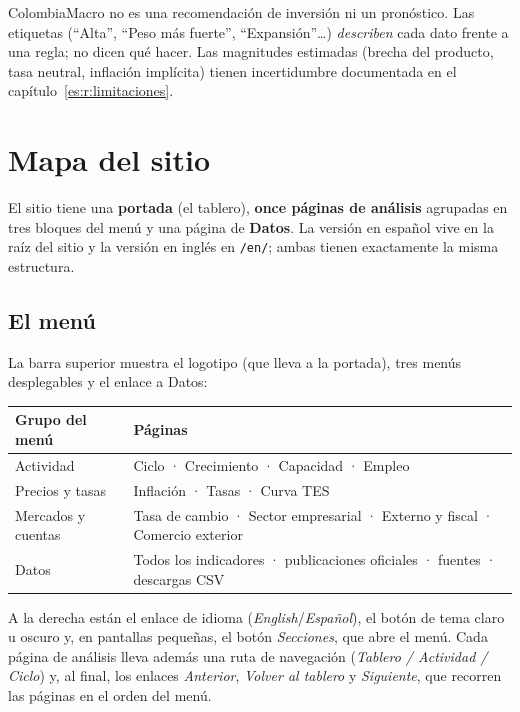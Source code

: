 \begin{alerta}
ColombiaMacro no es una recomendación de inversión ni un pronóstico. Las etiquetas (``Alta'', ``Peso más
fuerte'', ``Expansión''\ldots) \emph{describen} cada dato frente a una regla; no dicen qué hacer. Las
magnitudes estimadas (brecha del producto, tasa neutral, inflación implícita) tienen incertidumbre
documentada en el capítulo~\ref{es:r:limitaciones}.
\end{alerta}

\chapter{Mapa del sitio}
\label{es:u:mapa}

El sitio tiene una \textbf{portada} (el tablero), \textbf{once páginas de análisis} agrupadas en tres
bloques del menú y una página de \textbf{Datos}. La versión en español vive en la raíz del sitio y la versión
en inglés en \texttt{/en/}; ambas tienen exactamente la misma estructura.

\section{El menú}
La barra superior muestra el logotipo (que lleva a la portada), tres menús desplegables y el enlace a Datos:

\begin{center}\small
\begin{tabularx}{\linewidth}{@{}lX@{}}
\toprule
\textbf{Grupo del menú} & \textbf{Páginas}\\\midrule
Actividad & Ciclo · Crecimiento · Capacidad · Empleo\\
Precios y tasas & Inflación · Tasas · Curva TES\\
Mercados y cuentas & Tasa de cambio · Sector empresarial · Externo y fiscal · Comercio exterior\\
Datos & Todos los indicadores · publicaciones oficiales · fuentes · descargas CSV\\
\bottomrule
\end{tabularx}
\end{center}

A la derecha están el enlace de idioma (\emph{English}/\emph{Español}), el botón de tema claro u oscuro y, en
pantallas pequeñas, el botón  \emph{Secciones}, que abre el menú. Cada página de análisis lleva
además una ruta de navegación (\emph{Tablero / Actividad / Ciclo}) y, al final, los enlaces
\emph{Anterior}, \emph{Volver al tablero} y \emph{Siguiente}, que recorren las páginas en el orden del menú.

